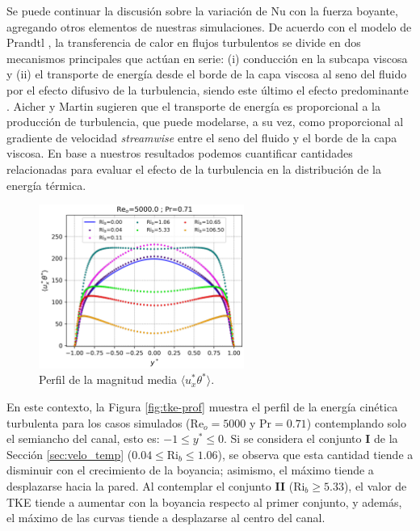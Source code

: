 Se puede continuar la discusión sobre la variación de Nu con la fuerza boyante, agregando otros elementos de nuestras simulaciones. De acuerdo con el modelo de Prandtl \cite{Prandtl1942}, la transferencia de calor en flujos turbulentos se divide en dos mecanismos principales que actúan en serie: (i) conducción en la subcapa viscosa y (ii) el transporte de energía desde el borde de la capa viscosa al seno del fluido por el efecto difusivo de la turbulencia, siendo este último el efecto predominante \cite{aicher1997, hall1969laminarization}. Aicher y Martin \cite{aicher1997} sugieren que el transporte de energía es proporcional a la producción de turbulencia, que puede modelarse, a su vez, como proporcional al gradiente de velocidad \textit{streamwise} entre el seno del fluido y el borde de la capa viscosa. En base a nuestros resultados podemos cuantificar  cantidades relacionadas para evaluar el efecto de la turbulencia en la distribución de la energía térmica. 

\newpage

\begin{figure}[H] %
  \centering
  \includegraphics[width=0.6\textwidth]{figures/cap5/Re5000-Pr071/uxphi_profile.png}  
  \caption{Perfil de la magnitud media $\langle u^{*}_x\theta^{*}\rangle$.}
  \label{fig:uphi-Re5000-Pr071}
\end{figure}




En este contexto, la Figura \ref{fig:tke-prof} muestra el perfil de la energía cinética turbulenta para los casos simulados ($\text{Re}_o=5000$ y $\text{Pr}=0\text{.}71$) contemplando solo el semiancho del canal, esto es: $-1 \leqslant y^* \leqslant 0$. Si se considera el conjunto \textbf{I} de la Sección \ref{sec:velo_temp} ($0\text{.}04 \leq \text{Ri}_b \leq 1\text{.}06$), se observa que esta cantidad tiende a disminuir con el crecimiento de la boyancia; asimismo, el máximo tiende a desplazarse hacia la pared. Al contemplar el conjunto \textbf{II} ($\text{Ri}_b \geq 5\text{.}33$), el valor de TKE tiende a aumentar con la boyancia respecto al primer conjunto, y además, el máximo de las curvas tiende a desplazarse al centro del canal.

